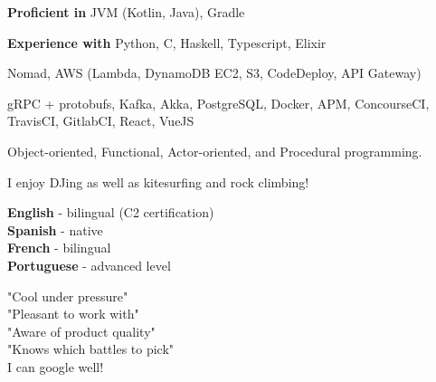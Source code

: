 \documentclass[9pt]{developercv}
\newcommand{\para}{\vspace{0.4em}}
\begin{document}
    \vspace{1em}
    \begin{minipage}[t]{0.62\textwidth}
        \vspace{-\baselineskip} %


        \vspace{-0.5em}
        \textbf{Proficient in} JVM (Kotlin, Java), Gradle

        \para
        \textbf{Experience with}
        Python, C, Haskell, Typescript, Elixir

        \para

        Nomad, AWS (Lambda, DynamoDB EC2, S3, CodeDeploy, API Gateway)

        \para

        gRPC + protobufs, Kafka, Akka, PostgreSQL, Docker, APM, ConcourseCI, TravisCI, GitlabCI, React,
        VueJS

        \para

        Object-oriented, Functional, Actor-oriented, and Procedural programming.
        \\


        \vspace{-0.5em}
        I enjoy DJing as well as kitesurfing and rock climbing!
    \end{minipage}
    \hfill
    \begin{minipage}[t]{0.35\textwidth}
        \vspace{-\baselineskip} %

        \vspace{-0.5em}
        \textbf{English} - bilingual (C2 certification)\\
        \textbf{Spanish} - native\\
        \textbf{French} - bilingual\\
        \textbf{Portuguese} - advanced level\\


        \vspace{-0.5em}
        "Cool under pressure"\\
        "Pleasant to work with"\\
        "Aware of product quality"\\
        "Knows which battles to pick"\\
        I can google well!
    \end{minipage}
    \vspace{1.2em}
    \hfill
%

\end{document}

